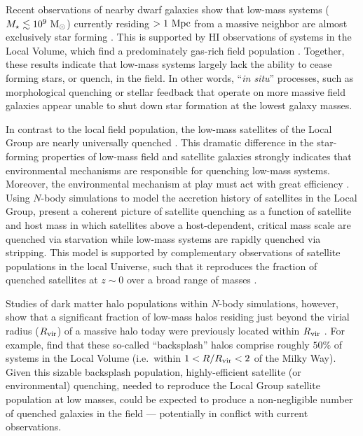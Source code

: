 \documentclass[usenatbib]{mnras}
\newcommand{\mstar}{{M}_{\star}}
\newcommand{\msun}{{\rm M}_{\odot}}
\begin{document}
Recent observations of nearby dwarf galaxies show that low-mass
systems ($\mstar \lesssim 10^{9}~\msun$) currently residing $>1~{\rm
  Mpc}$ from a massive neighbor are almost exclusively star forming
\citep{mateo98, haines08, weisz11a, geha12}.
%
This is supported by H{\scriptsize I} observations of systems in the Local
Volume, which find a predominately gas-rich field population \citep{spekkens14}.
%
Together, these results indicate that low-mass systems largely lack
the ability to cease forming stars, or quench, in the field. 
%
In other words, ``{\it in situ}'' processes, such as morphological
quenching \citep{martig09} or stellar feedback \citep{larson74, ds86}
that operate on more massive field galaxies appear unable to shut down
star formation at the lowest galaxy masses. 
%




In contrast to the local field population, the low-mass satellites of
the Local Group are nearly universally quenched
\citep[e.g.][]{mateo98, grcevich09, spekkens14}. 
%
This dramatic difference in the star-forming properties of low-mass
field and satellite galaxies strongly indicates that environmental
mechanisms are responsible for quenching low-mass systems. 
Moreover, the environmental mechanism at play must act with great
efficiency \citep[i.e.~rapidly following infall,][]{fham15, wetzel15b}.
%
Using $N$-body simulations to model the accretion history of satellites in the
Local Group, \citet{fham16} present a coherent picture of
satellite quenching as a function of satellite and host mass in which
satellites above a host-dependent, critical mass scale are quenched
via starvation while low-mass systems are rapidly quenched via stripping.
%
This model is supported by complementary observations of satellite populations
in the local Universe, such that it reproduces the fraction of quenched
satellites at $z \sim 0$ over a broad range of masses \citep[e.g.][]{delucia12,
  wetzel13, davies16, stark16}.





Studies of dark matter halo populations within $N$-body simulations,
however, show that a significant fraction of low-mass halos residing
just beyond the virial radius ($R_{\rm vir}$) of a massive halo today
were previously located within $R_{\rm vir}$ \citep{balogh00, mamon04,
  gill05, teyssier12, wetzel14}. 
%
For example, \citet{GK14} find that these so-called ``backsplash'' halos
comprise roughly $50\%$ of systems in the Local Volume (i.e.~within
$1 < R/R_{\rm vir} < 2$ of the Milky Way).
%
Given this sizable backsplash population, highly-efficient satellite (or
environmental) quenching, needed to reproduce the Local Group satellite
population at low masses, could be expected to produce a non-negligible
number of quenched galaxies in the field --- potentially in conflict
with current observations. 
%
\end{document}
